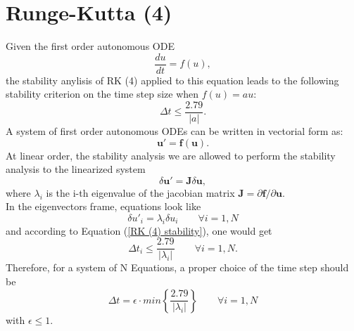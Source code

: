 \documentclass[12pt,twoside,openany]{book}
\begin{document}
\section{Runge-Kutta (4)}
Given the first order autonomous ODE 
\begin{equation}
    \frac{du}{dt}=f(u),
\end{equation}
the stability anylisis of RK (4) applied to this equation leads to the following stability criterion on the time step size when $f(u)=au$:
\begin{equation}\label{RK (4) stability}
    \Delta t \le \frac{2.79}{|a|}.
\end{equation}
A system of first order autonomous ODEs can be written in vectorial form as:
\begin{equation}
    \mathbf{u}'=\mathbf{f}(\mathbf{u}).
\end{equation}
At linear order, the stability analysis we are allowed to perform the stability analysis to the linearized system
\begin{equation}
    \delta \mathbf{u}'=\mathbf{J}\delta \mathbf{u},
\end{equation}
where $\lambda_i$ is the i-th eigenvalue of the jacobian matrix $\mathbf{J}=\partial \mathbf{f}/\partial \mathbf{u}$.\\In the eigenvectors frame, equations look like
\begin{equation}
    \delta u'_i=\lambda_i\delta u_i\qquad\forall i=1,N
\end{equation}
and according to Equation (\ref{RK (4) stability}), one would get 
\begin{equation}
    \Delta t_i \le \frac{2.79}{|\lambda_i|} \qquad \forall i=1,N.
\end{equation}
Therefore, for a system of N Equations, a proper choice of the time step should be
\begin{equation}
    \Delta t=\epsilon \cdot min\left \{\frac{2.79}{|\lambda_i|}\right\} \qquad \forall i=1,N
\end{equation}
with $\epsilon\le 1$.



\printbibliography
\end{document}
